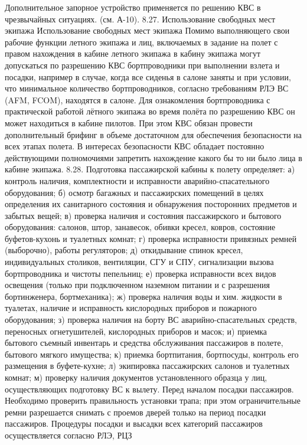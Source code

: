 Дополнительное запорное устройство применяется по решению КВС в чрезвычайных ситуациях. (см. А-10).
8.27. Использование свободных мест экипажа
Использование свободных мест экипажа
Помимо выполняющего свои рабочие функции летного экипажа и лиц, включаемых в задание на полет с правом нахождения в кабине летного экипажа в кабину экипажа могут допускаться по разрешению КВС бортпроводники при выполнении взлета и посадки, например в случае, когда все сиденья в салоне заняты и при условии, что минимальное количество бортпроводников, согласно требованиям РЛЭ ВС (AFM, FCOM), находятся в салоне.
Для ознакомления бортпроводника с практической работой лётного экипажа во время полёта по разрешению КВС он может находиться в кабине пилотов. При этом КВС обязан провести дополнительный брифинг в объеме достаточном для обеспечения безопасности на всех этапах полета.
В интересах безопасности КВС обладает постоянно действующими полномочиями запретить нахождение какого бы то ни было лица в кабине экипажа.
8.28. Подготовка пассажирской кабины к полету определяет:
а)	контроль наличия, комплектности и исправности аварийно-спасательного оборудования;
б)	осмотр багажных и пассажирских помещений в целях определения их санитарного состояния и обнаружения посторонних предметов и забытых вещей;
в)	проверка наличия и состояния пассажирского и бытового оборудования: салонов, штор, занавесок, обивки кресел, ковров, состояние буфетов-кухонь и туалетных комнат;
г)	проверка исправности привязных ремней (выборочно), работы регуляторов;
д)	откидывание спинок кресел, индивидуальных столиков, вентиляции, СГУ и СПУ, сигнализации вызова бортпроводника и чистоты пепельниц;
е)	проверка исправности всех видов освещения (только при подключенном наземном питании и с разрешения бортинженера, бортмеханика);
ж)	проверка наличия воды и хим. жидкости в туалетах, наличие и исправность кислородных приборов и пожарного оборудования;
з)	проверка наличия на борту ВС аварийно-спасательных средств, переносных огнетушителей, кислородных приборов и масок;
и)	приемка бытового съемный инвентарь и средства обслуживания пассажиров в полете, бытового мягкого имущества;
к)	приемка бортпитания, бортпосуды, контроль его размещения в буфете-кухне;
л)	экипировка пассажирских салонов и туалетных комнат;
м)	проверку наличия документов установленного образца у лиц, осуществляющих подготовку ВС к вылету.
Перед началом посадки пассажиров.
Необходимо проверить правильность установки трапа; при этом ограничительные ремни разрешается снимать с проемов дверей только на период посадки пассажиров.
Процедуры посадки и высадки всех категорий пассажиров осуществляется согласно РЛЭ, РЦЗ 
